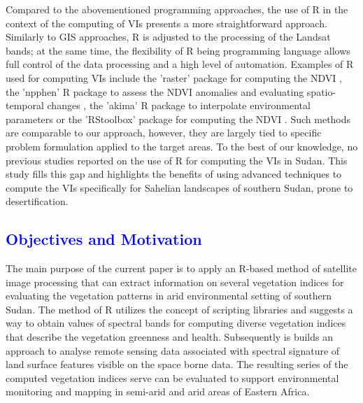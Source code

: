 \documentclass[jimaging,article,submit,pdftex,moreauthors]{Definitions/mdpi}
\begin{document}
Compared to the abovementioned programming approaches, the use of R in the context of the computing of VIs presents a more straightforward approach. Similarly to GIS approaches, R is adjusted to the processing of the Landsat bands; at the same time, the flexibility of R being programming language allows full control of the data processing and a high level of automation. Examples of R used for computing VIs include the 'raster' package for computing the NDVI \cite{LEVEAU2021127199}, the 'npphen' R package to assess the NDVI anomalies and evaluating spatio-temporal changes \cite{CHAVEZ2023103138}, the 'akima' R package to interpolate environmental parameters \cite{KLIMAVICIUS2023171} or the 'RStoolbox' package for computing the NDVI \cite{PRAVALIE2022108629}. Such methods are comparable to our approach, however, they are largely tied to specific problem formulation applied to the target areas. To the best of our knowledge, no previous studies reported on the use of R for computing the VIs in Sudan. This study fills this gap and highlights the benefits of using advanced techniques to compute the VIs specifically for Sahelian landscapes of southern Sudan, prone to desertification.

\subsection{\textcolor{blue}{Objectives and Motivation}}

The main purpose of the current paper is to apply an R-based method of satellite image processing that can extract information on several vegetation indices for evaluating the vegetation patterns in arid environmental setting of southern Sudan. The method of R utilizes the concept of scripting libraries and suggests a way to obtain values of spectral bands for computing diverse vegetation indices that describe the vegetation greenness and health. Subsequently is builds an approach to analyse remote sensing data associated with spectral signature of land surface features visible on the space borne data. The resulting series of the computed vegetation indices serve can be evaluated to support environmental monitoring and mapping in semi-arid and arid areas of Eastern Africa.
\end{document}
